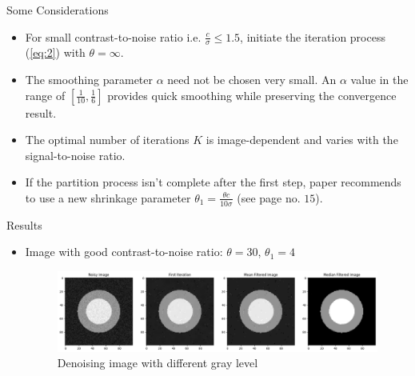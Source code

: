 \documentclass{beamer}
\begin{document}
\begin{frame}{Some Considerations}

    \begin{itemize}
     \item For small contrast-to-noise ratio i.e. $\frac{c}{\sigma} \leq 1.5$, initiate the iteration process (\ref{eq:2}) with $\theta = \infty$. 
     
     \item The smoothing parameter $\alpha$ need not be chosen very small. An $\alpha$ value in the range of $\left[\frac{1}{10}, \frac{1}{6}\right]$ provides quick smoothing while preserving the convergence result.
     
     \item The optimal number of iterations $K$ is image-dependent and varies with the signal-to-noise ratio. 
		\item If the partition process isn't complete after the first step, paper recommends to use a new shrinkage parameter $\theta_{1} =\frac{\theta c}{10\sigma} $ (see page no. $15$).

    \end{itemize}
\end{frame}
\begin{frame}{Results}

    \begin{itemize}
     \item Image with good contrast-to-noise ratio: $\theta = 30$, $\theta_1 = 4 $
     \begin{figure}[h] %
	
		\centering
		\includegraphics[width=1\linewidth]{img/output.png}
		\caption{Denoising image with different gray level}
		\label{fig:Denoising image with different gray level}
\end{figure}%
    \end{itemize}
\end{frame}
\end{document}
